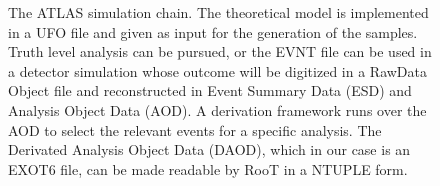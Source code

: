 \begin{figure}[t]
{\begin{tikzpicture}[scale=0.7]
\end{tikzpicture}
}
\caption{The ATLAS simulation chain. The theoretical model is implemented in a UFO file and given as input for the generation of the samples. Truth level analysis can be pursued, or the EVNT file can be used in a detector simulation whose outcome will be digitized in a RawData Object file and reconstructed in Event Summary Data (ESD) and Analysis Object Data (AOD). A derivation framework runs over the AOD to select the relevant events for a specific analysis. The Derivated Analysis Object Data (DAOD), which in our case is an EXOT6 file, can be made readable by RooT in a NTUPLE form.}
\label{fig:chain}
\end{figure}
